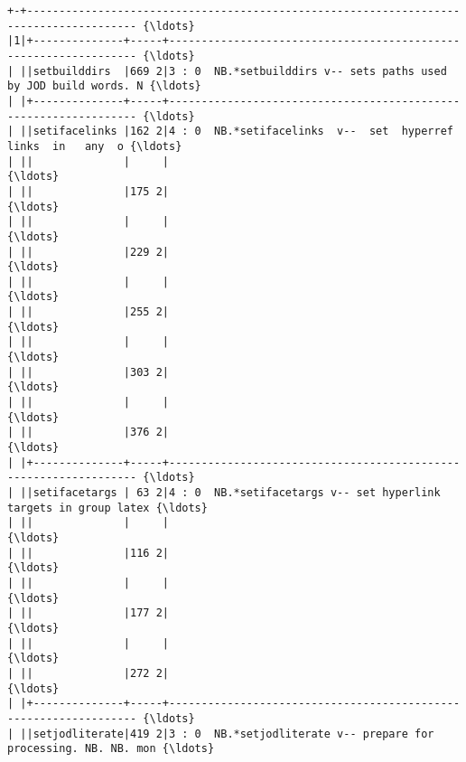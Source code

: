 \documentclass[11pt,letter,landscape]{article}
\begin{document}
    \begin{Verbatim}[commandchars=\\\{\}]
+-+--------------------------------------------------------------------------------------- {\ldots} 
|1|+--------------+-----+----------------------------------------------------------------- {\ldots} 
| ||setbuilddirs  |669 2|3 : 0  NB.*setbuilddirs v-- sets paths used by JOD build words. N {\ldots} 
| |+--------------+-----+----------------------------------------------------------------- {\ldots} 
| ||setifacelinks |162 2|4 : 0  NB.*setifacelinks  v--  set  hyperref   links  in   any  o {\ldots} 
| ||              |     |                                                                  {\ldots} 
| ||              |175 2|                                                                  {\ldots} 
| ||              |     |                                                                  {\ldots} 
| ||              |229 2|                                                                  {\ldots} 
| ||              |     |                                                                  {\ldots} 
| ||              |255 2|                                                                  {\ldots} 
| ||              |     |                                                                  {\ldots} 
| ||              |303 2|                                                                  {\ldots} 
| ||              |     |                                                                  {\ldots} 
| ||              |376 2|                                                                  {\ldots} 
| |+--------------+-----+----------------------------------------------------------------- {\ldots} 
| ||setifacetargs | 63 2|4 : 0  NB.*setifacetargs v-- set hyperlink targets in group latex {\ldots} 
| ||              |     |                                                                  {\ldots} 
| ||              |116 2|                                                                  {\ldots} 
| ||              |     |                                                                  {\ldots} 
| ||              |177 2|                                                                  {\ldots} 
| ||              |     |                                                                  {\ldots} 
| ||              |272 2|                                                                  {\ldots} 
| |+--------------+-----+----------------------------------------------------------------- {\ldots} 
| ||setjodliterate|419 2|3 : 0  NB.*setjodliterate v-- prepare for processing. NB. NB. mon {\ldots} 

\end{Verbatim}
\end{document}
